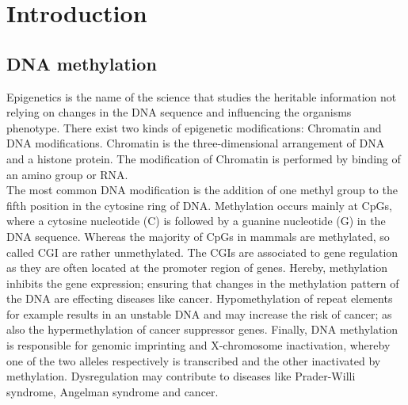 \pagestyle{headings}
\chapter{Introduction}
\label{chapter:introduction}
\section{DNA methylation} 
\label{section:DNAMeth} 
Epigenetics is the name of the science that studies the heritable information not relying on changes in the DNA sequence and influencing the organisms phenotype. There exist two kinds of epigenetic modifications: Chromatin and DNA modifications. Chromatin is the three-dimensional arrangement of DNA and a histone protein. The modification of Chromatin is performed by binding of an amino group or RNA.\cite{Epigenetics}\\

The most common DNA modification is the addition of one methyl group to the fifth position in the cytosine ring of DNA. Methylation occurs mainly at \acp{CpG}, where a cytosine nucleotide (C) is followed by a guanine nucleotide (G) in the DNA sequence.\cite{DNAMethylation} Whereas the majority of CpGs in mammals are methylated, so called \ac{CGI} are rather unmethylated. The \acp{CGI} are associated to gene regulation as they are often located at the promoter region of genes. Hereby, methylation inhibits the gene expression; ensuring that changes in the methylation pattern of the DNA are effecting diseases like cancer.\cite{Handbook} Hypomethylation of repeat elements for example results in an unstable DNA and may increase the risk of cancer; as also the hypermethylation of cancer suppressor genes.\cite{DNAMethylation} Finally, DNA methylation is responsible for genomic imprinting and X-chromosome inactivation, whereby one of the two alleles respectively is transcribed and the other inactivated by methylation. Dysregulation may contribute to diseases like Prader-Willi syndrome, Angelman syndrome and cancer. \cite{Walter}\\

